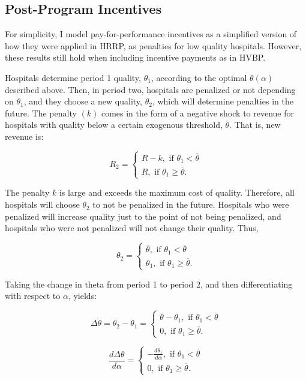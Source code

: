 \documentclass[12pt]{article}
\begin{document}
    \subsection{Post-Program Incentives}

    For simplicity, I model pay-for-performance incentives as a simplified version of how they were applied in HRRP, as penalties for low quality hospitals. However, these results still hold when including incentive payments as in HVBP. 

    Hospitals determine period 1 quality, $\theta_1$, according to the optimal $\theta(\alpha)$ described above. Then, in period two, hospitals are penalized or not depending on $\theta_1$, and they choose a new quality, $\theta_2$, which will determine penalties in the future. The penalty $(k)$ comes in the form of a negative shock to revenue for hospitals with quality below a certain exogenous threshold, $\overline{\theta}$. That is, new revenue is:

    $$R_2 = \begin{cases}
        R - k, \text{  if  } \theta_1<\overline{\theta}\\
        R, \text{  if  } \theta_1\geq \overline{\theta}.
    \end{cases}$$

    The penalty $k$ is large and exceeds the maximum cost of quality. Therefore, all hospitals will choose $\theta_2$ to not be penalized in the future. Hospitals who were penalized will increase quality just to the point of not being penalized, and hospitals who were not penalized will not change their quality. Thus,

    $$\theta_2 = \begin{cases}
        \overline{\theta}, \text{  if  } \theta_1<\overline{\theta}\\
        \theta_1, \text{  if  } \theta_1\geq \overline{\theta}.
    \end{cases}$$

    \noindent Taking the change in theta from period 1 to period 2, and then differentiating with respect to $\alpha$, yields: 

    $$\Delta\theta = \theta_2-\theta_1 = \begin{cases}
        \overline{\theta}-\theta_1, \text{  if  } \theta_1<\overline{\theta}\\
        0, \text{  if  } \theta_1\geq \overline{\theta}.
    \end{cases}$$

    $$\frac{d\Delta\theta}{d\alpha} = \begin{cases}
        -\frac{d\theta_1}{d\alpha}, \text{  if  } \theta_1<\overline{\theta}\\
        0, \text{  if  } \theta_1\geq \overline{\theta}.
    \end{cases}$$
\end{document}
